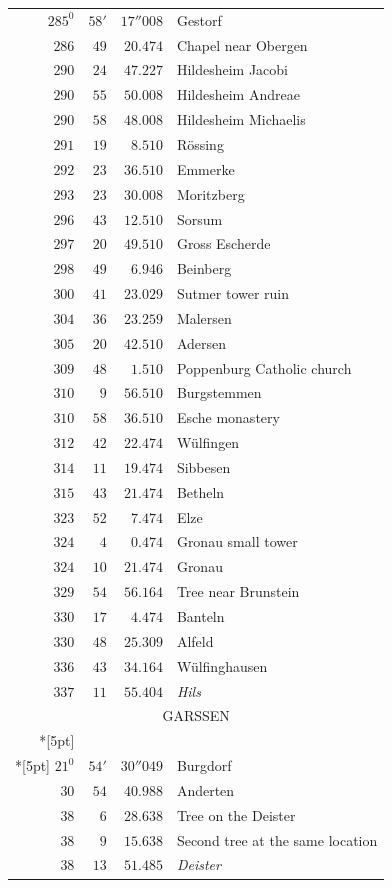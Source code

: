 \clearpage
{}%
\begingroup
\fontsize{10.5}{13}\selectfont
\setlength{\tabcolsep}{3pt}
\setlength{\LTpre}{2pt}
\setlength{\LTpost}{2pt}
\begin{longtable}{@{}rrrp{.61\linewidth}@{}}
\(285^{0}\)&\(58'\)&\(17''008\)&\raggedright Gestorf\tabularnewline
\(286\)&\(49\)&\(20.474\)&\raggedright Chapel near Obergen\tabularnewline
\(290\)&\(24\)&\(47.227\)&\raggedright Hildesheim Jacobi\tabularnewline
\(290\)&\(55\)&\(50.008\)&\raggedright Hildesheim Andreae\tabularnewline
\(290\)&\(58\)&\(48.008\)&\raggedright Hildesheim Michaelis\tabularnewline
\(291\)&\(19\)&\(8.510\)&\raggedright Rössing\tabularnewline
\(292\)&\(23\)&\(36.510\)&\raggedright Emmerke\tabularnewline
\(293\)&\(23\)&\(30.008\)&\raggedright Moritzberg\tabularnewline
\(296\)&\(43\)&\(12.510\)&\raggedright Sorsum\tabularnewline
\(297\)&\(20\)&\(49.510\)&\raggedright Gross Escherde\tabularnewline
\(298\)&\(49\)&\(6.946\)&\raggedright Beinberg\tabularnewline
\(300\)&\(41\)&\(23.029\)&\raggedright Sutmer tower ruin\tabularnewline
\(304\)&\(36\)&\(23.259\)&\raggedright Malersen\tabularnewline
\(305\)&\(20\)&\(42.510\)&\raggedright Adersen\tabularnewline
\(309\)&\(48\)&\(1.510\)&\raggedright Poppenburg Catholic church\tabularnewline
\(310\)&\(9\)&\(56.510\)&\raggedright Burgstemmen\tabularnewline
\(310\)&\(58\)&\(36.510\)&\raggedright Esche monastery\tabularnewline
\(312\)&\(42\)&\(22.474\)&\raggedright Wülfingen\tabularnewline
\(314\)&\(11\)&\(19.474\)&\raggedright Sibbesen\tabularnewline
\(315\)&\(43\)&\(21.474\)&\raggedright Betheln\tabularnewline
\(323\)&\(52\)&\(7.474\)&\raggedright Elze\tabularnewline
\(324\)&\(4\)&\(0.474\)&\raggedright Gronau small tower\tabularnewline
\(324\)&\(10\)&\(21.474\)&\raggedright Gronau\tabularnewline
\(329\)&\(54\)&\(56.164\)&\raggedright Tree near Brunstein\tabularnewline
\(330\)&\(17\)&\(4.474\)&\raggedright Banteln\tabularnewline
\(330\)&\(48\)&\(25.309\)&\raggedright Alfeld\tabularnewline
\(336\)&\(43\)&\(34.164\)&\raggedright Wülfinghausen\tabularnewline
\(337\)&\(11\)&\(55.404\)&\raggedright \textit{Hils}\tabularnewline
\multicolumn{4}{c}{\strut GARSSEN}\\*[5pt]
\multicolumn{4}{c}{\(-125867.401\)\qquad\(-13888.808\)}\\*[5pt]
\(21^{0}\)&\(54'\)&\(30''049\)&\raggedright Burgdorf\tabularnewline
\(30\)&\(54\)&\(40.988\)&\raggedright Anderten\tabularnewline
\(38\)&\(6\)&\(28.638\)&\raggedright Tree on the Deister\tabularnewline
\(38\)&\(9\)&\(15.638\)&\raggedright Second tree at the same location\tabularnewline
\(38\)&\(13\)&\(51.485\)&\raggedright \textit{Deister}\tabularnewline

\end{longtable}
